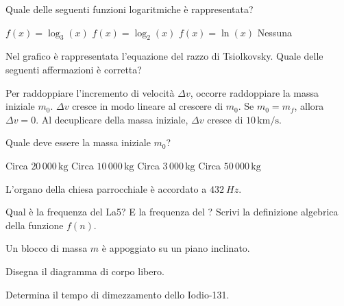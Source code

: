\documentclass[10pt]{article}
\begin{document}
\begin{parts}
  \itemx[pts=1] Quale delle seguenti funzioni logaritmiche è rappresentata?
    \begin{choices}
      \correct $f(x) = \log_3(x)$
      \choice $f(x) = \log_2(x)$
      \choice $f(x) = \ln(x)$
      \choice[fixed] Nessuna   %
    \end{choices}
  \itemx[pts=1] Nel grafico è rappresentata l'equazione del razzo di Tsiolkovsky. Quale delle seguenti affermazioni è corretta?
    \begin{choices}
      \choice Per raddoppiare l'incremento di velocità $\Delta v$, occorre raddoppiare la massa iniziale $m_0$.
      \choice $\Delta v$ cresce in modo lineare al crescere di $m_0$.
      \correct Se $m_0 = m_f$, allora $\Delta v = 0$.
      \choice Al decuplicare della massa iniziale, $\Delta v$ cresce di $10 \, \textrm{km/s}$.
    \end{choices}
  \itemx[pts=1] Quale deve essere la massa iniziale $m_0$?
    \begin{choices}
      \correct Circa $20\,000 \, \textrm{kg}$
      \choice Circa $10\,000 \, \textrm{kg}$
      \choice Circa $3\,000 \, \textrm{kg}$
      \choice Circa $50\,000 \, \textrm{kg}$
    \end{choices}
\end{parts}

\exercise L'organo della chiesa parrocchiale è accordato a $\qty{432}{Hz}$.
\begin{parts}[stretch=1.25]
  \itemx Qual è la frequenza del La5? E la frequenza del ?
  \itemx Scrivi la definizione algebrica della funzione $f(n)$.
\end{parts}
\exercisescore[5]   %

\exercise[diff=3] Un blocco di massa $m$ è appoggiato su un piano inclinato.

\begin{center}
\end{center}
\begin{parts}
  \itemx[pts=2] Disegna il diagramma di corpo libero.
\end{parts}

\bonusexercise Determina il tempo di dimezzamento dello Iodio-131.
\bonusexercisescore[0.5]
\bonusexercisenote

\vfill
\finalscore   %
\end{document}
